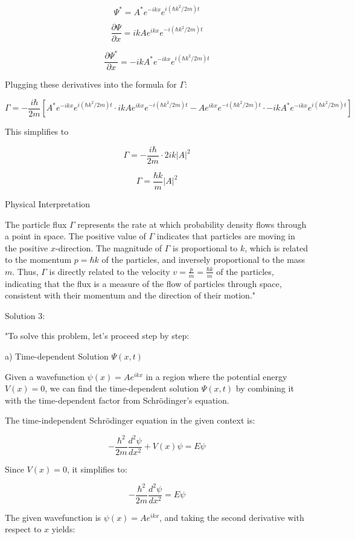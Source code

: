 \[
\Psi^{*} = A^*e^{-ikx}e^{i(\hbar k^2/2m)t}
\]

\[
\frac{\partial\Psi}{\partial x} = ikAe^{ikx}e^{-i(\hbar k^2/2m)t}
\]

\[
\frac{\partial\Psi^{*}}{\partial x} = -ikA^*e^{-ikx}e^{i(\hbar k^2/2m)t}
\]

Plugging these derivatives into the formula for \( \Gamma \):

\[
\Gamma = -\frac{i\hbar}{2m}\left[ A^*e^{-ikx}e^{i(\hbar k^2/2m)t} \cdot ikAe^{ikx}e^{-i(\hbar k^2/2m)t} - Ae^{ikx}e^{-i(\hbar k^2/2m)t} \cdot -ikA^*e^{-ikx}e^{i(\hbar k^2/2m)t} \right]
\]

This simplifies to

\[
\Gamma = -\frac{i\hbar}{2m} \cdot 2ik|A|^2
\]

\[
\Gamma = \frac{\hbar k}{m}|A|^2
\]

Physical Interpretation

The particle flux \( \Gamma \) represents the rate at which probability density flows through a point in space. The positive value of \( \Gamma \) indicates that particles are moving in the positive \( x \)-direction. The magnitude of \( \Gamma \) is proportional to \( k \), which is related to the momentum \( p = \hbar k \) of the particles, and inversely proportional to the mass \( m \). Thus, \( \Gamma \) is directly related to the velocity \( v = \frac{p}{m} = \frac{\hbar k}{m} \) of the particles, indicating that the flux is a measure of the flow of particles through space, consistent with their momentum and the direction of their motion."

Solution 3:

"To solve this problem, let's proceed step by step:

a) Time-dependent Solution \( \Psi(x,t) \)

Given a wavefunction \( \psi(x) = Ae^{ikx} \) in a region where the potential energy \( V(x) = 0 \), we can find the time-dependent solution \( \Psi(x,t) \) by combining it with the time-dependent factor from Schrödinger's equation.

The time-independent Schrödinger equation in the given context is:

\[ -\frac{\hbar^2}{2m}\frac{d^2\psi}{dx^2} + V(x)\psi = E\psi \]

Since \( V(x) = 0 \), it simplifies to:

\[ -\frac{\hbar^2}{2m}\frac{d^2\psi}{dx^2} = E\psi \]

The given wavefunction is \( \psi(x) = Ae^{ikx} \), and taking the second derivative with respect to \( x \) yields:

